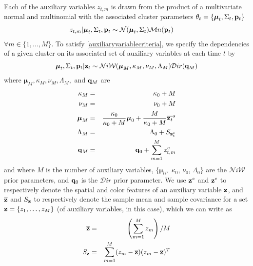 \documentclass[twocolumn, final]{svjour3}
\begin{document}
Each of the auxiliary variables $z_{t,m}$ is drawn from the product of a multivariate normal and multinomial with the associated cluster parameters $\theta_{t} = \{ \boldsymbol{\mu}_{t}, \Sigma_{t}, \bold{p}_{t} \}$
\begin{equation}
\label{transker1}
z_{t, m} | \boldsymbol{\mu}_{t}, \Sigma_{t}, \bold{p}_{t}  \sim  \mathcal{N}(\boldsymbol{\mu}_{t}, \Sigma_{t}) \mathcal{M}n(\bold{p}_{t})   \hspace{15pt}   
\end{equation}
$\forall m \in \{ 1, \ldots, M \}$. To satisfy \eqref{auxiliaryvariablecriteria}, we specify the dependencies of a given cluster on its associated set of auxiliary variables at each time $t$ by
\begin{equation}
\label{transker2}
\boldsymbol{\mu}_{t}, \Sigma_{t}, \bold{p}_{t} | \bold{z}_t  \sim  \mathcal{N}i\mathcal{W}(\boldsymbol{\mu}_{M}, \kappa_{M}, \nu_{M}, \Lambda_{M})  \mathcal{D}ir(\bold{q}_{M})
\end{equation}
where $\boldsymbol{\mu}_{M}, \kappa_{M}, \nu_{M}, \Lambda_{M},$ and $\bold{q}_{M}$ are
\begin{eqnarray}
\kappa_{M} &=& \kappa_{0} + M \\
\nu_{M} &=& \nu_{0} + M \\
\boldsymbol{\mu}_{M} &=& \frac{\kappa_{0}}{\kappa_{0}+M} \boldsymbol{\mu}_{0}  +  \frac{M}{\kappa_{0}+M} \overline{\bold{z}_t}^{s}\\
\Lambda_{M} &=& \Lambda_{0} + S_{\bold{z}_{t}^{s}}\\
\bold{q}_{M} &=& \bold{q}_{0} + \sum_{m=1}^{M} z_{t,m}^{c}
\end{eqnarray}
and where $M$ is the number of auxiliary variables, $\{ \boldsymbol{\mu}_{0},$ $\kappa_{0}$, $\nu_{0}$, $\Lambda_{0} \}$ are the $\mathcal{N}i\mathcal{W}$ prior parameters, and $\bold{q}_{0}$ is the $\mathcal{D}ir$ prior parameter. We use $\bold{z}^{s}$ and $\bold{z}^{c}$ to respectively denote the spatial and color features of an auxiliary variable $\bold{z}$, and $\overline{\bold{z}}$ and $S_{\bold{z}}$ to respectively denote the sample mean and sample covariance for a set $\bold{z} = \{ z_{1}, \ldots, z_{M} \}$ (of auxiliary variables, in this case), which we can write as
\begin{eqnarray}
\label{samplemean}
\overline{\bold{z}}  &=&  \left( \sum_{m=1}^{M} z_{m} \right) / M\\
\label{samplecov}
S_{\bold{z}}  &=&  \sum_{m=1}^{M} (z_{m} - \overline{\bold{z}}) (z_{m} - \overline{\bold{z}})^{T}
\end{eqnarray}
\end{document}
